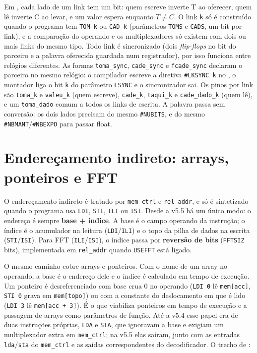 Em , cada lado de um link tem um bit: quem escreve inverte T ao oferecer, quem lê
inverte C ao levar, e um valor espera enquanto $T \neq C$. O link \lstinline|k| só é
construído quando o programa tem \lstinline|TOM k| ou \lstinline|CAD k| (parâmetros
\lstinline|TOMS| e \lstinline|CADS|, um bit por link), e a comparação do operando e os
multiplexadores só existem com dois ou mais links do mesmo tipo. Todo link é sincronizado
(dois \emph{flip-flops} no bit do parceiro e a palavra oferecida guardada num registrador),
por isso funciona entre relógios diferentes. As formas \lstinline|toma_sync|,
\lstinline|cade_sync| e \lstinline|fcade_sync| declaram o parceiro no mesmo relógio: o
compilador escreve a diretiva \lstinline|#LKSYNC k| no , o montador liga o bit
\lstinline|k| do parâmetro \lstinline|LSYNC| e o sincronizador sai. Os pinos por link são
\lstinline|toma_k| e \lstinline|valeu_k| (quem escreve), \lstinline|cade_k|,
\lstinline|taqui_k| e \lstinline|cade_dado_k| (quem lê), e um \lstinline|toma_dado| comum a
todos os links de escrita. A palavra passa sem conversão: os dois lados precisam do mesmo
\lstinline|#NUBITS|, e do mesmo \lstinline|#NBMANT|/\lstinline|#NBEXPO| para passar float.

\section{Endereçamento indireto: arrays, ponteiros e FFT}
\label{sec:arq-indireto}

O endereçamento indireto é tratado por \lstinline|mem_ctrl| e \lstinline|rel_addr|, e só é
sintetizado quando o programa usa \lstinline|LDI|, \lstinline|STI|, \lstinline|ILI| ou
\lstinline|ISI|. Desde a v5.5 há um único modo: o endereço é sempre \textbf{base + índice}. A
base é o campo operando da instrução; o índice é o acumulador na leitura
(\lstinline|LDI|/\lstinline|ILI|) e o topo da pilha de dados na escrita
(\lstinline|STI|/\lstinline|ISI|). Para FFT (\lstinline|ILI|/\lstinline|ISI|), o índice passa
por \textbf{reversão de bits} (\lstinline|FFTSIZ| bits), implementada em \lstinline|rel_addr|
quando \lstinline|USEFFT| está ligado.

O mesmo caminho cobre arrays e ponteiros. Com o nome de um array no operando, a base é o
endereço dele e o índice é calculado em tempo de execução. Um ponteiro é desreferenciado com
base crua 0 no operando (\lstinline|LDI 0| lê \lstinline|mem[acc]|, \lstinline|STI 0| grava
em \lstinline|mem[topo]|) ou com a constante do deslocamento em que é lido
(\lstinline|LDI 3| lê \lstinline|mem[acc + 3]|). É o que viabiliza ponteiros em tempo de
execução e a passagem de arrays como parâmetros de função. Até a v5.4 esse papel era de
duas instruções próprias, \lstinline|LDA| e \lstinline|STA|, que ignoravam a base e exigiam
um multiplexador extra em \lstinline|mem_ctrl|; na v5.5 elas saíram, junto com as entradas
\lstinline|lda|/\lstinline|sta| do \lstinline|mem_ctrl| e as saídas correspondentes do
decodificador. O trecho de :

